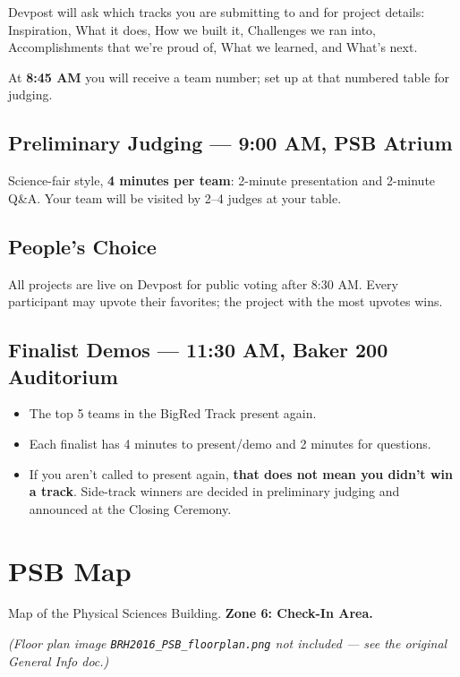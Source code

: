 \documentclass[11pt]{article}
\begin{document}
Devpost will ask which tracks you are submitting to and for project details:
Inspiration, What it does, How we built it, Challenges we ran into,
Accomplishments that we're proud of, What we learned, and What's next.

At \textbf{8:45 AM} you will receive a team number; set up at that numbered
table for judging.

\subsection*{Preliminary Judging --- 9:00 AM, PSB Atrium}
Science-fair style, \textbf{4 minutes per team}: 2-minute presentation and
2-minute Q\&A. Your team will be visited by 2--4 judges at your table.

\subsection*{People's Choice}
All projects are live on Devpost for public voting after 8:30 AM. Every
participant may upvote their favorites; the project with the most upvotes wins.

\subsection*{Finalist Demos --- 11:30 AM, Baker 200 Auditorium}
\begin{itemize}
  \item The top 5 teams in the BigRed Track present again.
  \item Each finalist has 4 minutes to present/demo and 2 minutes for questions.
  \item If you aren't called to present again, \textbf{that does not mean you
        didn't win a track}. Side-track winners are decided in preliminary
        judging and announced at the Closing Ceremony.
\end{itemize}

\section{PSB Map}
Map of the Physical Sciences Building. \textbf{Zone 6: Check-In Area.}

\noindent\emph{(Floor plan image \texttt{BRH2016\_PSB\_floorplan.png} not
included --- see the original General Info doc.)}
\end{document}
